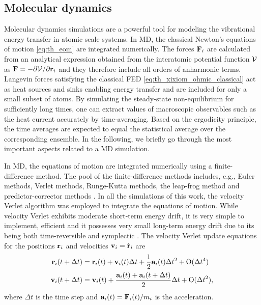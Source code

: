 \subsection{Molecular dynamics}
\label{sec:methods_md}

Molecular dynamics simulations are a powerful tool for modeling the vibrational energy transfer in atomic scale systems. In MD, the classical Newton's equations of motion \eqref{eq:th_eom}  are integrated numerically. The forces $\mathbf{F}_i$ are calculated from an analytical expression obtained from the interatomic potential function $\mathcal{V}$ as $\mathbf{F}=-\partial \mathcal{V}/\partial \mathbf{r}_i$ and they therefore include all orders of anharmonic terms. Langevin forces satisfying the classical FED \eqref{eq:th_xixiom_ohmic_classical} act as heat sources and sinks enabling energy transfer and are included for only a small subset of atoms.  By simulating the steady-state non-equilibrium for sufficiently long times, one can extract values of macroscopic observables such as the heat current accurately by time-averaging. Based on the ergodicity principle, the time averages are expected to equal the statistical average over the corresponding ensemble. In the following, we briefly go through the most important aspects related to a MD simulation.


In MD, the equations of motion are integrated numerically using a finite-difference method. The pool of the finite-difference methods includes, e.g., Euler methods, Verlet methods, Runge-Kutta methods, the leap-frog method and predictor-corrector methods \cite{allentildesley}. In all the simulations of this work, the velocity Verlet algorithm was employed to integrate the equations of motion. While velocity Verlet exhibits moderate short-term energy drift, it is very simple to implement, efficient and it possesses very small long-term energy drift due to its being both time-reversible and symplectic \cite{frenkelsmit}. The velocity Verlet update equations for the positions $\mathbf{r}_i$ and velocities $\mathbf{v}_i=\dot{\mathbf{r}}_i$ are \cite{allentildesley}
\begin{alignat}{2}
  \mathbf{r}_i(t+\Delta t) &= \mathbf{r}_i(t) + \mathbf{v}_i(t)\Delta t+  \frac{1}{2}\mathbf{a}_i(t) \Delta t^2 + \mathrm{O}(\Delta t^4) \\
  \mathbf{v}_i(t+\Delta t) &= \mathbf{v}_i(t) + \frac{ \mathbf{a}_i(t)+\mathbf{a}_i(t+\Delta t)}{2} \Delta t+ \mathrm{O}(\Delta t^2) ,
\end{alignat}
where $\Delta t$ is the time step and $\mathbf{a}_i(t)=\mathbf{F}_i(t)/m_i$ is the acceleration.

